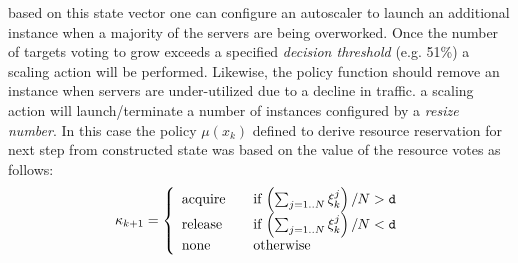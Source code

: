 

%
 
based on this state vector one can configure an autoscaler to launch an additional instance when a 
majority of the servers are being overworked. 
Once the number of targets voting to grow exceeds a specified \textit{decision threshold} (e.g. 51\%) a scaling action will be performed. 
Likewise, the policy function should remove an instance when servers are under-utilized due to a decline in traffic.
a scaling action will launch/terminate a number of instances configured by a \textit{resize number}. 
In this case the policy $\mu(x_k)$ defined to derive resource reservation for next step from constructed state was based on the value of the resource votes as follows: 
\[
  \kappa_{k+1} = \left\{ 
  \begin{array}{l l}
    \text{acquire} & \quad \text{if $\left(\sum_{j=1..N} \xi^{j}_k\right)/N > \mathtt{d}$}\\
    \text{release} & \quad \text{if $\left(\sum_{j=1..N} \xi^{j}_k\right)/N < \mathtt{d}$}\\
    \text{none} & \quad \text{otherwise} 
  \end{array} \right. 
\]

